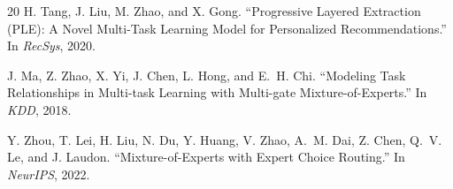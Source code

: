 \documentclass{article}
\begin{document}
\begin{thebibliography}{20}
H. Tang, J. Liu, M. Zhao, and X. Gong.
``Progressive Layered Extraction (PLE): A Novel Multi-Task Learning Model for Personalized Recommendations.''
In \emph{RecSys}, 2020.

J. Ma, Z. Zhao, X. Yi, J. Chen, L. Hong, and E.~H. Chi.
``Modeling Task Relationships in Multi-task Learning with Multi-gate Mixture-of-Experts.''
In \emph{KDD}, 2018.

Y. Zhou, T. Lei, H. Liu, N. Du, Y. Huang, V. Zhao, A.~M. Dai, Z. Chen, Q.~V. Le, and J. Laudon.
``Mixture-of-Experts with Expert Choice Routing.''
In \emph{NeurIPS}, 2022.

\end{thebibliography}
\end{document}

